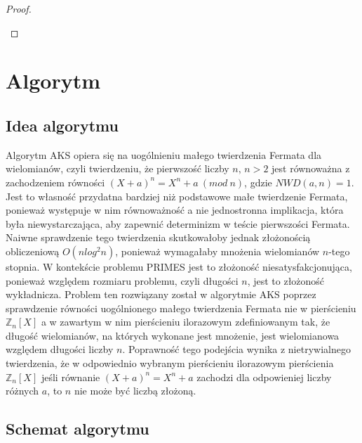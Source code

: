 \documentclass[declaration,shortabstract]{iithesis}
\theoremstyle{definition}
\theoremstyle{remark} \newtheorem{observation}{Obserwacja}
\theoremstyle{plain} \newtheorem{theorem}{Twierdzenie}
\theoremstyle{plain} \newtheorem{lemma}{Lemat}
\theoremstyle{remark} \newtheorem*{remark*}{Uwaga}
\theoremstyle{reminder} \newtheorem*{reminder*}{Przypomnienie}
\begin{document}
\begin{proof}
\begin{enumerate}[label=Ad.\arabic*.,leftmargin=.4in]
	\end{enumerate}
\end{proof}
	
\chapter{Algorytm}

\section{Idea algorytmu}

Algorytm AKS opiera się na uogólnieniu małego twierdzenia Fermata dla wielomianów, czyli twierdzeniu, że pierwszość liczby $n, \, n > 2$ jest równoważna z zachodzeniem równości $(X + a)^n = X^n + a \: (mod \: n)$, gdzie $NWD(a, n) = 1$. Jest to własność przydatna bardziej niż podstawowe małe twierdzenie Fermata, ponieważ występuje w nim równoważność a nie jednostronna implikacja, która była niewystarczająca, aby zapewnić determinizm w teście pierwszości Fermata. Naiwne sprawdzenie tego twierdzenia skutkowałoby jednak złożonością obliczeniową $O(nlog^2n)$, ponieważ wymagałaby mnożenia wielomianów $n$-tego stopnia. W kontekście problemu PRIMES jest to złożoność niesatysfakcjonująca, ponieważ względem rozmiaru problemu, czyli długości $n$, jest to złożoność wykładnicza. Problem ten rozwiązany został w algorytmie AKS poprzez sprawdzenie równości uogólnionego małego twierdzenia Fermata nie w pierścieniu $\mathbb{Z}_n[X]$ a w zawartym w nim pierścieniu ilorazowym zdefiniowanym tak, że długość wielomianów, na których wykonane jest mnożenie, jest wielomianowa względem długości liczby $n$. Poprawność tego podejścia wynika z nietrywialnego twierdzenia, że w odpowiednio wybranym pierścieniu ilorazowym pierścienia $\mathbb{Z}_n[X]$ jeśli równanie $(X + a)^n = X^n + a$ zachodzi dla odpowieniej liczby różnych $a$, to $n$ nie może być liczbą złożoną. 

\section{Schemat algorytmu}
	
\end{document}
